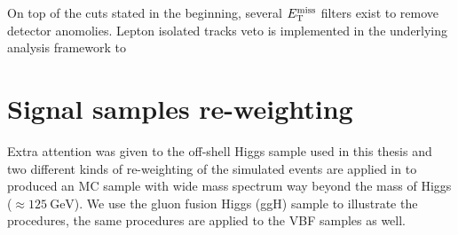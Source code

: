 On top of the cuts stated in the beginning, several $E_{\mathrm{T}}^{\mathrm{miss}}$ filters exist to remove detector 
anomolies. Lepton isolated tracks veto is implemented
in the underlying analysis framework to 

\section{Signal samples re-weighting}
\label{sec:sig_rewgt}
Extra attention was given to the off-shell Higgs sample used in this thesis and two different kinds
of re-weighting of the simulated events are applied in to produced an MC sample with wide
mass spectrum way beyond the mass of Higgs ($\approx \SI{125}{\giga\electronvolt}$). We use the
gluon fusion Higgs (ggH) sample to illustrate the procedures, the same procedures are applied to
the VBF samples as well.

